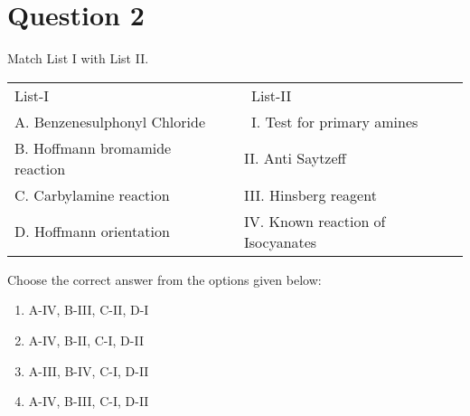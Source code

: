 \documentclass{article}
\begin{document}
\section*{Question 2}
Match List I with List II.\begin{longtable}[]{@{}ll@{}}

\toprule\noalign{}

\endhead

\bottomrule\noalign{}

\endlastfoot

List-I~~ & ~List-II~ \\

A. Benzenesulphonyl Chloride & ~I. Test for primary amines~ \\

B. Hoffmann bromamide reaction~~ & II. Anti Saytzeff~~ \\

C. Carbylamine reaction~ & III. Hinsberg reagent~ \\

D. Hoffmann orientation~ & IV. Known reaction of Isocyanates~ \\

\end{longtable}

Choose the correct answer from the options given below: \newline
\begin{enumerate}[label=(\alph*)]
\item A-IV, B-III, C-II, D-I
\item A-IV, B-II, C-I, D-II
\item A-III, B-IV, C-I, D-II
\item A-IV, B-III, C-I, D-II
\end{enumerate}
\newpage
\end{document}
